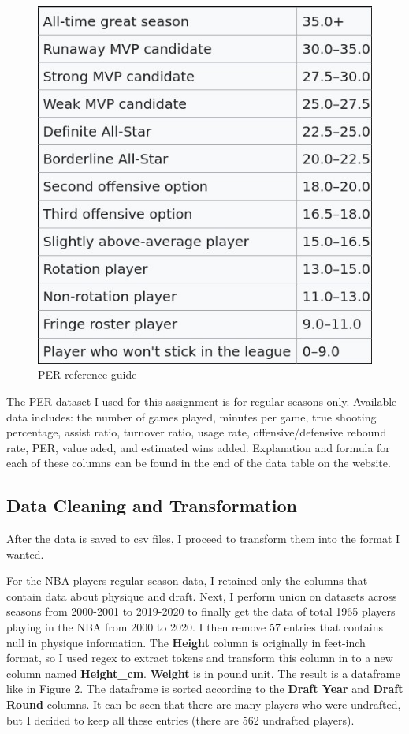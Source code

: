 \documentclass[a4paper,12pt,twoside]{article}
\numberwithin{equation}{section}
\begin{document}
\begin{figure}[h]
\caption{PER reference guide}
\includegraphics[scale=0.3]{hop.jpg}
\centering
\end{figure}

The PER dataset I used for this assignment is for regular seasons only. Available data includes: the number of games played, minutes per game, true shooting percentage, assist ratio, turnover ratio, usage rate, offensive/defensive rebound rate, PER, value aded, and estimated wins added. Explanation and formula for each of these columns can be found in the end of the data table on the website.


\subsection{Data Cleaning and Transformation}
After the data is saved to csv files, I proceed to transform them into the format I wanted. 

For the NBA players regular season data, I retained only the columns that contain data about physique and draft. Next, I perform union on datasets across seasons from 2000-2001 to 2019-2020 to finally get the data of total 1965 players playing in the NBA from 2000 to 2020. I then remove 57 entries that contains null in physique information. The \textbf{Height} column is originally in feet-inch format, so I used regex to extract tokens and transform this column in to a new column named \textbf{Height\_cm}. \textbf{Weight} is in pound unit.  The result is a dataframe like in Figure 2. The dataframe is sorted according to the \textbf{Draft Year} and \textbf{Draft Round} columns. It can be seen that there are many players who were undrafted, but I decided to keep all these entries (there are 562 undrafted players).
\end{document}
